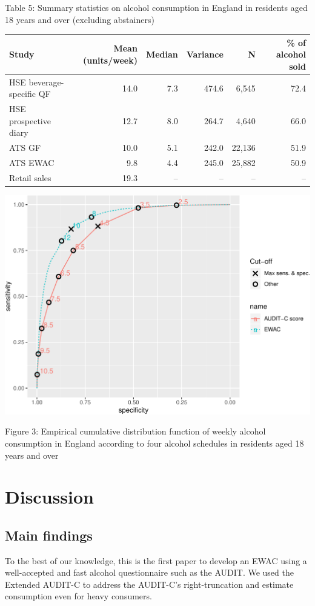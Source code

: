 \documentclass[]{article}
\begin{document}
Table 5: Summary statistics on alcohol consumption in England in
residents aged 18 years and over (excluding abstainers)

\begin{longtable}[]{@{}lrrrrr@{}}
\toprule
Study & Mean (units/week) & Median & Variance & N & \% of alcohol
sold\tabularnewline
\midrule
\endhead
HSE beverage-specific QF & 14.0 & 7.3 & 474.6 & 6,545 &
72.4\tabularnewline
HSE prospective diary & 12.7 & 8.0 & 264.7 & 4,640 & 66.0\tabularnewline
ATS GF & 10.0 & 5.1 & 242.0 & 22,136 & 51.9\tabularnewline
ATS EWAC & 9.8 & 4.4 & 245.0 & 25,882 & 50.9\tabularnewline
Retail sales & 19.3 & -- & -- & -- & --\tabularnewline
\bottomrule
\end{longtable}



\includegraphics{analysis_files/figure-latex/unnamed-chunk-11-1.pdf}

Figure 3: Empirical cumulative distribution function of weekly alcohol
consumption in England according to four alcohol schedules in residents
aged 18 years and over

\hypertarget{discussion}{%
\section{Discussion}\label{discussion}}

\hypertarget{main-findings}{%
\subsection{Main findings}\label{main-findings}}

To the best of our knowledge, this is the first paper to develop an EWAC
using a well-accepted and fast alcohol questionnaire such as the AUDIT.
We used the Extended AUDIT-C to address the AUDIT-C's right-truncation
and estimate consumption even for heavy consumers.
\end{document}
